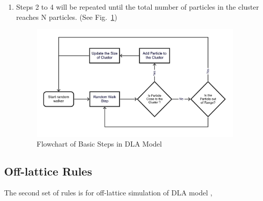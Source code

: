 \documentclass[aps,preprint,groupedaddress,letterpaper]{revtex4-1}
\begin{document}
\begin{enumerate}
    \item Steps 2 to 4 will be repeated until the total number of particles in the cluster reaches N particles. (See Fig.~\ref{basic_steps})
    
    \begin{figure}[h]
    \centering
    \includegraphics[width=4.0in]{img/BasicStep.jpg}
    \caption{Flowchart of Basic Steps in DLA Model 
    \label{basic_steps}}
    \end{figure}
\end{enumerate}

\subsection{Off-lattice Rules}

The second set of rules is for off-lattice simulation of DLA model \cite{scalelaw},
\end{document}
